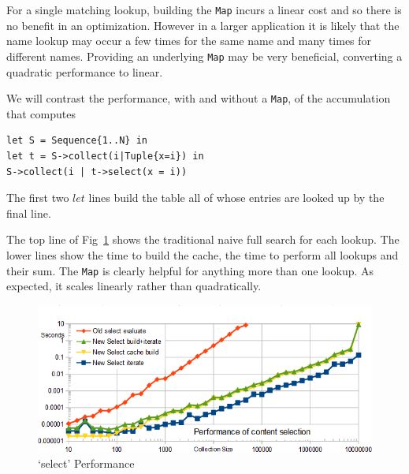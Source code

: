 \documentclass{llncs}
\begin{document}
For a single matching lookup, building the \verb$Map$ incurs a linear cost and so there is no benefit in an optimization. However in a larger application it is likely that the name lookup may occur a few  times for the same name and many times for different names. Providing an underlying \verb$Map$ may be very beneficial, converting a quadratic performance to linear.


We will contrast the performance, with and without a \verb$Map$, of the accumulation that computes 

\begin{verbatim}
let S = Sequence{1..N} in
let t = S->collect(i|Tuple{x=i}) in
S->collect(i | t->select(x = i))
\end{verbatim}

The first two $let$ lines build the table all of whose entries are looked up by the final line.

The top line of Fig~\ref{fig:SelectionPerformance} shows the traditional naive full search for each lookup. The lower lines show the time to build the cache, the time to perform all lookups and their sum. The \verb$Map$ is clearly helpful for anything more than one lookup. As expected, it scales linearly rather than quadratically.

\begin{figure}
	\begin{center}
		\includegraphics[width=4.5in]{SelectionPerformance.png}
	\end{center}
	\caption{`select' Performance}
	\label{fig:SelectionPerformance}
\end{figure}
  
\end{document}
